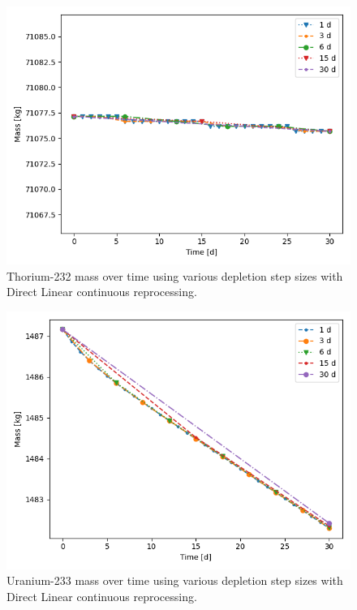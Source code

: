 \begin{figure}[H]
  \centering
  \includegraphics[scale=0.7]{images/DL_NSTEP_Th-232_mass.png}
  \caption{Thorium-232 mass over time using various depletion step sizes with Direct Linear continuous reprocessing.}
   \label{fig:DL-cont-th}
\end{figure}

\begin{figure}[H]
  \centering
  \includegraphics[scale=0.7]{images/DL_NSTEP_U-233_mass.png}
  \caption{Uranium-233 mass over time using various depletion step sizes with Direct Linear continuous reprocessing.}
   \label{fig:DL-cont-u}
\end{figure}

